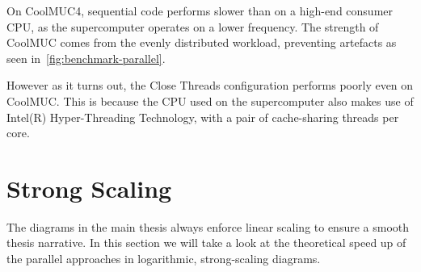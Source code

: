 \documentclass[11pt,
               a4paper,
               bibtotoc,
               idxtotoc,
               headsepline,
               footsepline,
               footexclude,
               BCOR12mm,
               DIV13,
               openany,   %
               ]
               {scrbook}
\begin{document}
On CoolMUC4, sequential code performs slower than on a high-end consumer CPU, as the supercomputer operates on a lower frequency. The strength of CoolMUC comes from the evenly distributed workload, preventing artefacts as seen in~\autoref{fig:benchmark-parallel}.

However as it turns out, the Close Threads configuration performs poorly even on CoolMUC. This is because the CPU used on the supercomputer also makes use of Intel(R) Hyper-Threading Technology, with a pair of cache-sharing threads per core.


\section{Strong Scaling}\label{section:strong-scaling}

The diagrams in the main thesis always enforce linear scaling to ensure a smooth thesis narrative. In this section we will take a look at the theoretical speed up of the parallel approaches in logarithmic, strong-scaling diagrams.
\end{document}
